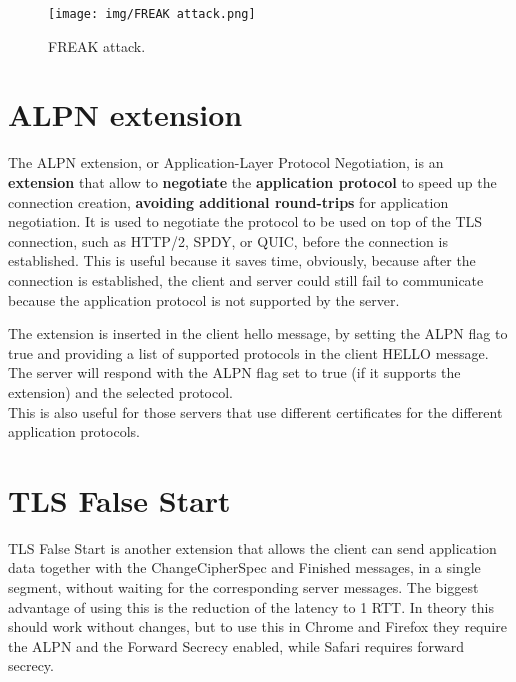 \begin{figure}[H]
  \centering
  \texttt{[image: img/FREAK attack.png]}
  \caption{FREAK attack.}
  \label{fig:freak-attack}
\end{figure}

\section{ALPN extension}
The ALPN extension, or Application-Layer Protocol Negotiation, is an
\textbf{extension} that allow to \textbf{negotiate} the
\textbf{application protocol} to speed up the connection creation,
\textbf{avoiding additional round-trips} for application negotiation.
It is used to negotiate the protocol to be used on top of the TLS
connection, such as HTTP/2, SPDY, or QUIC, before the connection is
established. This is useful because it saves time, obviously, because
after the connection is established, the client and server could still
fail to communicate because the application protocol is not supported
by the server.

The extension is inserted in the client hello message, by setting the
ALPN flag to true and providing a list of supported protocols in the
client HELLO message. The server will respond with the ALPN flag set
to true (if it supports the extension) and the selected protocol.\\
This is also useful for those servers that use different certificates
for the different application protocols.

\section{TLS False Start}
TLS False Start is another extension that allows the client can send
application data together with the ChangeCipherSpec and Finished
messages, in a single segment, without waiting for the corresponding
server messages. The biggest advantage of using this is the reduction
of the latency to 1 RTT. In theory this should work without changes,
but to use this in Chrome and Firefox they require the ALPN and the 
Forward Secrecy enabled, while Safari requires forward secrecy.

